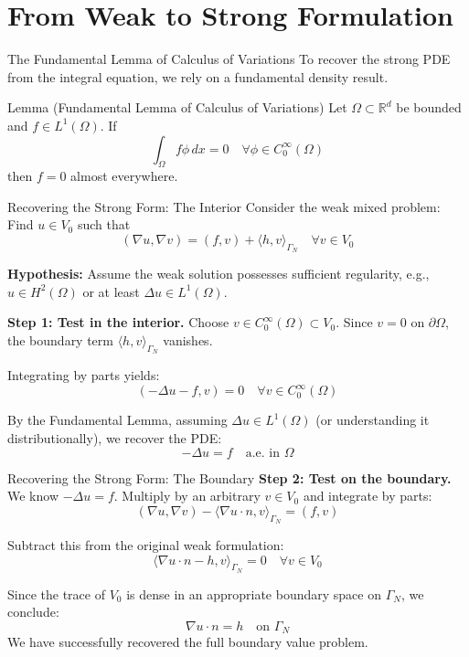 \documentclass[aspectratio=169]{beamer}
\begin{document}
\section{From Weak to Strong Formulation}

\begin{frame}{The Fundamental Lemma of Calculus of Variations}
    To recover the strong PDE from the integral equation, we rely on a fundamental density result.
    
    \vspace{0.3cm}
    \begin{block}{Lemma (Fundamental Lemma of Calculus of Variations)}
        Let $\Omega \subset \mathbb{R}^d$ be bounded and $f \in L^1(\Omega)$. If
        $$ \int_\Omega f \phi \, dx = 0 \quad \forall \phi \in C_0^\infty(\Omega) $$
        then $f = 0$ almost everywhere.
    \end{block}
\end{frame}

\begin{frame}{Recovering the Strong Form: The Interior}
    Consider the weak mixed problem: Find $u \in V_0$ such that
    $$ (\nabla u, \nabla v) = (f, v) + \langle h, v \rangle_{\Gamma_N} \quad \forall v \in V_0 $$

    \textbf{Hypothesis:} Assume the weak solution possesses sufficient regularity, e.g., $u \in H^2(\Omega)$ or at least $\Delta u \in L^1(\Omega)$.
    
    \textbf{Step 1: Test in the interior.} 
    Choose $v \in C_0^\infty(\Omega) \subset V_0$. Since $v=0$ on $\partial\Omega$, the boundary term $\langle h, v \rangle_{\Gamma_N}$ vanishes.
    
    Integrating by parts yields:
    $$ (-\Delta u - f, v) = 0 \quad \forall v \in C_0^\infty(\Omega) $$
    
    By the Fundamental Lemma, assuming $\Delta u \in L^1(\Omega)$ (or understanding it distributionally), we recover the PDE:
    $$ -\Delta u = f \quad \text{a.e. in } \Omega $$
\end{frame}

\begin{frame}{Recovering the Strong Form: The Boundary}
    \textbf{Step 2: Test on the boundary.}
    We know $-\Delta u = f$. Multiply by an arbitrary $v \in V_0$ and integrate by parts:
    $$ (\nabla u, \nabla v) - \langle \nabla u \cdot n, v \rangle_{\Gamma_N} = (f, v) $$
    
    Subtract this from the original weak formulation:
    $$ \langle \nabla u \cdot n - h, v \rangle_{\Gamma_N} = 0 \quad \forall v \in V_0 $$
    
    Since the trace of $V_0$ is dense in an appropriate boundary space on $\Gamma_N$, we conclude:
    $$ \nabla u \cdot n = h \quad \text{on } \Gamma_N $$
    We have successfully recovered the full boundary value problem.
\end{frame}
\end{document}
